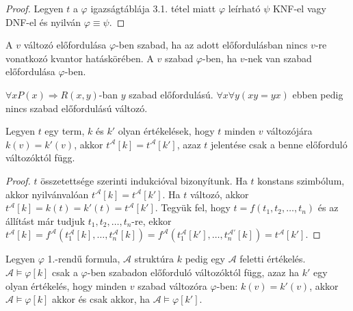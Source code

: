 \begin{proof} Legyen $t$ a $\varphi$ igazságtáblája 3.1. tétel miatt $\varphi$ leírható $\psi$ KNF-el vagy DNF-el és nyilván $\varphi \equiv \psi$.
\end{proof}
\begin{defi} A $v$ változó előfordulása $\varphi$-ben szabad, ha az adott előfordulásban nincs $v$-re vonatkozó kvantor hatáskörében. A $v$ szabad $\varphi$-ben, ha $v$-nek van szabad előfordulása $\varphi$-ben.
\end{defi}
\begin{exmpl} $\forall x P(x) \Rightarrow R(x,y)$-ban $y$ szabad előfordulású.  $\forall x \forall y (xy = yx)$ ebben pedig nincs szabad előfordulású változó.
\end{exmpl}
\begin{state} Legyen $t$ egy term, $k$ és $k'$ olyan értékelések, hogy $t$ minden $v$ változójára $k(v) = k'(v)$, akkor $t^\mathcal{A}[k] = t^{\mathcal{A}}[k']$, azaz $t$ jelentése csak a benne előforduló változóktól függ.
\end{state}
\begin{proof}$t$ összetettsége szerinti indukcióval bizonyítunk. 
Ha $t$ konstans szimbólum, akkor nyilvánvalóan $t^\mathcal{A}[k] = t^{\mathcal{A}}[k']$. Ha $t$ változó, akkor $t^\mathcal{A}[k] = k(t) = k'(t) = t^{\mathcal{A}}[k']$. Tegyük fel, hogy $t = f(t_1,t_2,\ldots,t_{n})$ és az állítást már tudjuk $t_1,t_2,\ldots,t_{n}$-re, ekkor $t^\mathcal{A}[k] = f^\mathcal{A}(t^\mathcal{A}_1[k],\ldots,t^\mathcal{A}_n[k]) = f^\mathcal{A}(t^\mathcal{A}_1[k'],\ldots,t^\mathcal{A'}_n[k]) = t^\mathcal{A}[k']$.
\end{proof}
\begin{theo} Legyen $\varphi$ 1.-rendű formula, $\mathcal{A}$ struktúra $k$ pedig egy $\mathcal{A}$ feletti értékelés. $\mathcal{A} \models \varphi[k]$ csak a $\varphi$-ben szabadon előforduló változóktól függ, azaz ha $k'$ egy olyan értékelés, hogy minden $v$ szabad változóra $\varphi$-ben: $k(v)=k'(v)$, akkor $\mathcal{A} \models \varphi[k]$ akkor és csak akkor, ha $\mathcal{A} \models \varphi[k']$.
\end{theo}
